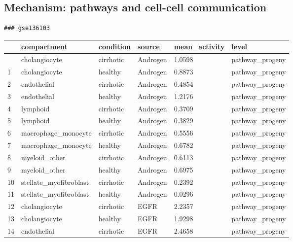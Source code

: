 \documentclass[
  letterpaper,
  DIV=11,
  numbers=noendperiod]{scrartcl}
\newcounter{none} %
\begin{document}
\subsection{Mechanism: pathways and cell-cell
communication}\label{mechanism-pathways-and-cell-cell-communication}

\begin{verbatim}
### gse136103
\end{verbatim}

{\def\LTcaptype{none} %
\begin{longtable}[]{@{}llllll@{}}
\toprule\noalign{}
& compartment & condition & source & mean\_activity & level \\
\midrule\noalign{}
\endhead
\bottomrule\noalign{}
\endlastfoot
0 & cholangiocyte & cirrhotic & Androgen & 1.0598 & pathway\_progeny \\
1 & cholangiocyte & healthy & Androgen & 0.8873 & pathway\_progeny \\
2 & endothelial & cirrhotic & Androgen & 0.4854 & pathway\_progeny \\
3 & endothelial & healthy & Androgen & 1.2176 & pathway\_progeny \\
4 & lymphoid & cirrhotic & Androgen & 0.3709 & pathway\_progeny \\
5 & lymphoid & healthy & Androgen & 0.3829 & pathway\_progeny \\
6 & macrophage\_monocyte & cirrhotic & Androgen & 0.5556 &
pathway\_progeny \\
7 & macrophage\_monocyte & healthy & Androgen & 0.6782 &
pathway\_progeny \\
8 & myeloid\_other & cirrhotic & Androgen & 0.6113 & pathway\_progeny \\
9 & myeloid\_other & healthy & Androgen & 0.6975 & pathway\_progeny \\
10 & stellate\_myofibroblast & cirrhotic & Androgen & 0.2392 &
pathway\_progeny \\
11 & stellate\_myofibroblast & healthy & Androgen & 0.0296 &
pathway\_progeny \\
12 & cholangiocyte & cirrhotic & EGFR & 2.2357 & pathway\_progeny \\
13 & cholangiocyte & healthy & EGFR & 1.9298 & pathway\_progeny \\
14 & endothelial & cirrhotic & EGFR & 2.4658 & pathway\_progeny \\
\end{longtable}
}
\end{document}
